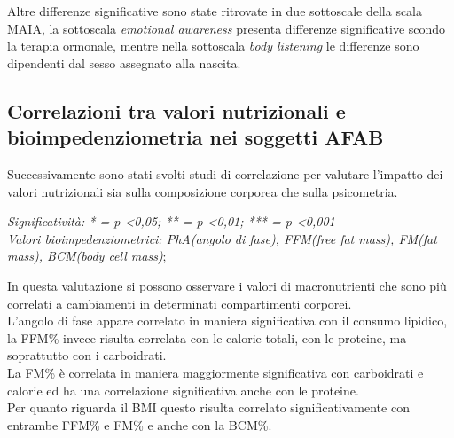 \documentclass[12pt]{article}
\begin{document}
Altre differenze significative sono state ritrovate in due sottoscale della scala MAIA, la sottoscala \emph{emotional awareness} presenta differenze significative scondo la terapia ormonale, mentre nella sottoscala \emph{body listening} le differenze sono dipendenti dal sesso assegnato alla nascita.
\subsection{Correlazioni tra valori nutrizionali e bioimpedenziometria nei soggetti AFAB}
\label{sec:org576f275}

Successivamente sono stati svolti studi di correlazione per valutare l'impatto dei valori nutrizionali sia sulla composizione corporea che sulla psicometria.

\begin{table}[H]
    \centering
    \caption{Correlazioni tra valori nutrizionali e BIA nei pazienti AFAB}
    \vspace*{0.2em}
{\renewcommand{\arraystretch}{2}%
}
    \label{tab:my_label}
    \footnotesize \textit{Significatività: * = p <0,05; ** = p <0,01; *** = p <0,001 \\ Valori bioimpedenziometrici: PhA(angolo di fase), FFM(free fat mass), FM(fat mass), BCM(body cell mass)};
\end{table}

In questa valutazione si possono osservare i valori di macronutrienti che sono più correlati a cambiamenti in determinati compartimenti corporei.\\
L'angolo di fase appare correlato in maniera significativa con il consumo lipidico, la FFM\% invece risulta correlata con le calorie totali, con le proteine, ma soprattutto con i carboidrati.\\
La FM\% è correlata in maniera maggiormente significativa con carboidrati e calorie ed ha una correlazione significativa anche con le proteine.\\
Per quanto riguarda il BMI questo risulta correlato significativamente con entrambe FFM\% e FM\% e anche con la BCM\%.
\end{document}
